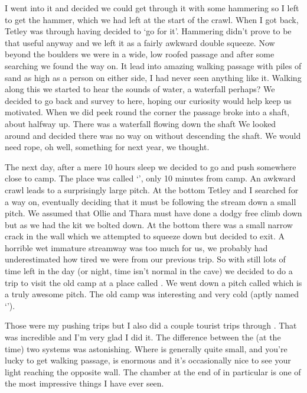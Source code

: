I went into it and decided we could get through it with some hammering so I left to get the hammer, which we had left at the start of the crawl. When I got back, Tetley was through having decided to ‘go for it’. Hammering didn’t prove to be that useful anyway and we left it as a fairly awkward double squeeze. Now beyond the boulders we were in a wide, low roofed passage and after some searching we found the way on. It lead into amazing walking passage with piles of sand as high as a person on either side, I had never seen anything like it. Walking along this we started to hear the sounds of water, a waterfall perhaps? We decided to go back and survey to here, hoping our curiosity would help keep us motivated. When we did peek round the corner the passage broke into a shaft, about halfway up. There was a waterfall flowing down the shaft We looked around and decided there was no way on without descending the shaft. We would need rope, oh well, something for next year, we thought.


The next day, after a mere 10 hours sleep we decided to go and push somewhere close to camp. The place was called ‘’, only 10 minutes from camp. An awkward crawl leads to a surprisingly large pitch. At the bottom Tetley and I searched for a way on, eventually deciding that it must be following the stream down a small pitch. We assumed that Ollie and Thara must have done a dodgy free climb down but as we had the kit we bolted down. At the bottom there was a small narrow crack in the wall which we attempted to squeeze down but decided to exit. A horrible wet immature streamway was too much for us, we probably had underestimated how tired we were from our previous trip. So with still lots of time left in the day (or night, time isn’t normal in the cave) we decided to do a trip to visit the old camp at a place called . We went down a pitch called  which is a truly awesome pitch. The old camp was interesting and very cold (aptly named ‘’).

Those were my pushing trips but I also did a couple tourist trips through . That was incredible and I’m very glad I did it. The difference between the (at the time) two systems was astonishing. Where  is generally quite small, and you’re lucky to get walking passage,  is enormous and it's occasionally nice to see your light reaching the opposite wall. The chamber at the end of  in particular is one of the most impressive things I have ever seen.


